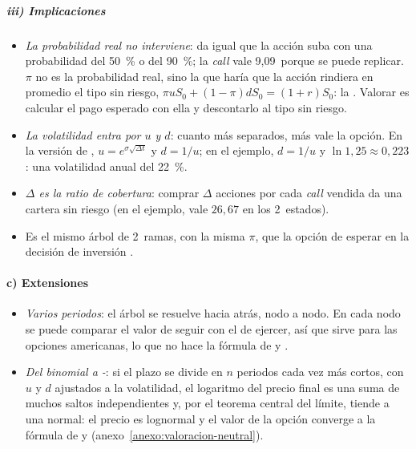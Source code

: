 \documentclass[11pt]{article}
\begin{document}
\subparagraph{iii) Implicaciones}

\begin{itemize}
\item \emph{La probabilidad real no interviene}: da igual que la acción suba con una probabilidad del 50~\% o del 90~\%; la \emph{call} vale 9,09~porque se puede replicar. $\pi$ no es la probabilidad real, sino la que haría que la acción rindiera en promedio el tipo sin riesgo, $\pi uS_0+(1-\pi)dS_0=(1+r)S_0$: la . Valorar es calcular el pago esperado con ella y descontarlo al tipo sin riesgo.
\item \emph{La volatilidad entra por $u$ y $d$}: cuanto más separados, más vale la opción. En la versión de \textcite{CoxRossRubinstein1979Option}, $u=e^{\sigma\sqrt{\Delta t}}$ y $d=1/u$; en el ejemplo, $d=1/u$ y $\ln1{,}25\approx0{,}223$: una volatilidad anual del 22~\%.
\item \emph{$\Delta$ es la ratio de cobertura}: comprar $\Delta$ acciones por cada \emph{call} vendida da una cartera sin riesgo (en el ejemplo, vale $26{,}67$ en los 2~estados).
\item Es el mismo árbol de 2~ramas, con la misma $\pi$, que la opción de esperar en la decisión de inversión  .
\end{itemize}

\paragraph{c) Extensiones}

\begin{itemize}
\item \emph{Varios periodos}: el árbol se resuelve hacia atrás, nodo a nodo. En cada nodo se puede comparar el valor de seguir con el de ejercer, así que sirve para las opciones americanas, lo que no hace la fórmula de  y .
\item \emph{Del binomial a -}: si el plazo se divide en $n$ periodos cada vez más cortos, con $u$ y $d$ ajustados a la volatilidad, el logaritmo del precio final es una suma de muchos saltos independientes y, por el teorema central del límite, tiende a una normal: el precio es lognormal y el valor de la opción converge a la fórmula de  y \nocite{CoxRossRubinstein1979Option} (anexo~\ref{anexo:valoracion-neutral}).
\end{itemize}
\end{document}
